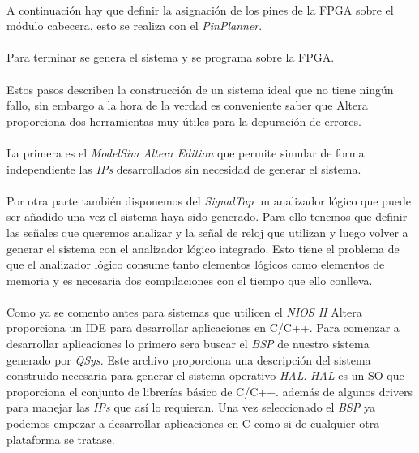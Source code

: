 \documentclass[a4paper,12pt,titlepage,final]{book}
\begin{document}
\paragraph{}
A continuación hay que definir la asignación de los pines de la FPGA sobre el módulo cabecera, esto se realiza con el \textit{PinPlanner}.

\paragraph{}
Para terminar se genera el sistema y se programa sobre la FPGA.

\paragraph{}
Estos pasos describen la construcción de un sistema ideal que no tiene ningún fallo, sin embargo a la hora de la verdad es conveniente saber que Altera proporciona dos herramientas muy útiles para la depuración de errores. 

\paragraph{}
La primera es el \textit{ModelSim Altera Edition} que permite simular de forma independiente las \textit{IPs} desarrollados sin necesidad de generar el sistema.

\paragraph{}
Por otra parte también disponemos del \textit{SignalTap} un analizador lógico que puede ser añadido una vez el sistema haya sido generado. Para ello tenemos que definir las señales que queremos analizar y la señal de reloj que utilizan y luego volver a generar el sistema con el analizador lógico integrado. Esto tiene el problema de que el analizador lógico consume tanto elementos lógicos como elementos de memoria y es necesaria dos compilaciones con el tiempo que ello conlleva.

\paragraph{}
Como ya se comento antes para sistemas que utilicen el \textit{NIOS II} Altera proporciona un IDE para desarrollar aplicaciones en C/C++. Para comenzar a desarrollar aplicaciones lo primero sera buscar el \textit{BSP} de nuestro sistema generado por \textit{QSys}. Este archivo proporciona una descripción del sistema construido necesaria para generar el sistema operativo \textit{HAL}. \textit{HAL} es un SO que proporciona el conjunto de librerías básico de C/C++. además de algunos drivers para manejar las \textit{IPs} que así lo requieran. Una vez seleccionado el \textit{BSP} ya podemos empezar a desarrollar aplicaciones en C como si de cualquier otra plataforma se tratase.
\end{document}
